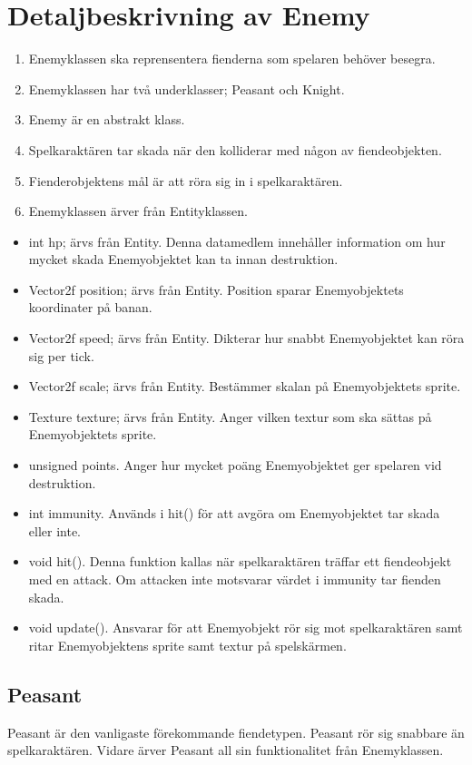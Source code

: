 \documentclass{TDP005mall}
\begin{document}
\section{Detaljbeskrivning av Enemy}
\begin{enumerate}
\item Enemyklassen ska reprensentera fienderna som spelaren behöver besegra. 
\item Enemyklassen har två underklasser; Peasant och Knight.
\item Enemy är en abstrakt klass. 
\item Spelkaraktären tar skada när den kolliderar med någon av fiendeobjekten. 
\item Fienderobjektens mål är att röra sig in i spelkaraktären. 
\item Enemyklassen ärver från Entityklassen.
\end{enumerate}
\begin{itemize}
\item int hp; ärvs från Entity. Denna datamedlem innehåller information om hur mycket skada Enemyobjektet kan ta innan destruktion.
\item Vector2f position; ärvs från Entity. Position sparar Enemyobjektets koordinater på banan.
\item Vector2f speed; ärvs från Entity. Dikterar hur snabbt Enemyobjektet kan röra sig per tick.
\item Vector2f scale; ärvs från Entity. Bestämmer skalan på Enemyobjektets sprite.
\item Texture texture; ärvs från Entity. Anger vilken textur som ska sättas på Enemyobjektets sprite.
\item unsigned points. Anger hur mycket poäng Enemyobjektet ger spelaren vid destruktion.
\item int immunity. Används i hit() för att avgöra om Enemyobjektet tar skada eller inte.
\item void hit(). Denna funktion kallas när spelkaraktären träffar ett fiendeobjekt med en attack. Om attacken inte motsvarar värdet i immunity tar fienden skada.
\item void update(). Ansvarar för att Enemyobjekt rör sig mot spelkaraktären samt ritar Enemyobjektens sprite samt textur på spelskärmen.
\end{itemize}
\subsection{Peasant}
Peasant är den vanligaste förekommande fiendetypen. 
Peasant rör sig snabbare än spelkaraktären.
Vidare ärver Peasant all sin funktionalitet från Enemyklassen.
\end{document}
